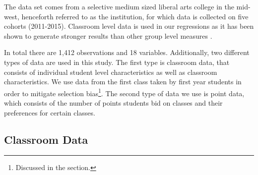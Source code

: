 The data set comes from a selective medium sized liberal arts college in the mid-west, henceforth referred to as the institution, for which data is collected on five cohorts (2011-2015). 
Classroom level data is used in our regressions as it has been shown to generate stronger results than other group level measures \citep{burke2013classroom}. 

In total there are 1,412 observations and 18 variables. 
Additionally, two different types of data are used in this study. 
The first type is classroom data, that consists of individual student level characteristics as well as classroom characteristics. 
We use data from the first class taken by first year students in order to mitigate selection bias\footnote{Discussed in the  section.}. %
The second type of data we use is point data, which consists of the number of points students bid on classes and their preferences for certain classes. 

\subsection{Classroom Data}\label{data:classdata}


